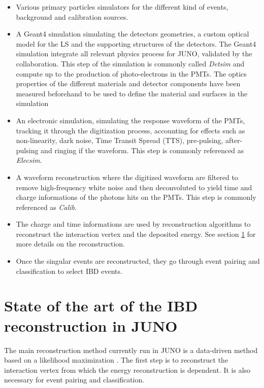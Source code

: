 \begin{itemize}
  \item Various primary particles simulators for the different kind of events, background and calibration sources.
  \item A Geant4 \cite{agostinelli_geant4simulation_2003, allison_geant4_2006, allison_recent_2016} simulation simulating the detectors geometries, a custom optical model for the LS and the supporting structures of the detectors. The Geant4 simulation integrate all relevant physics process for JUNO, validated by the collaboration. This step of the simulation is commonly called \textit{Detsim} and compute up to the production of photo-electrons in the PMTs. The optics properties of the different materials and detector components have been measured beforehand to be used to define the material and surfaces in the simulation
  \item An electronic simulation, simulating the response waveform of the PMTs, tracking it through the digitization process, accounting for effects such as non-linearity, dark noise, Time Transit Spread (TTS), pre-pulsing, after-pulsing and ringing if the waveform. This step is commonly referenced as \textit{Elecsim}.
  \item A waveform reconstruction where the digitized waveform are filtered to remove high-frequency white noise and then deconvoluted to yield time and charge informations of the photons hits on the PMTs. This step is commonly referenced as \textit{Calib}.
  \item The charge and time informations are used by reconstruction algorithms to reconstruct the interaction vertex and the deposited energy. See section \ref{sec:reco} for more details on the reconstruction.
  \item Once the singular events are reconstructed, they go through event pairing and classification to select IBD events.
\end{itemize}

\section{State of the art of the IBD reconstruction in JUNO}
\label{sec:reco}

The main reconstruction method currently run in JUNO is a data-driven method based on a likelihood maximization \cite{wu_new_2019, huang_improving_2021}. The first step is to reconstruct the interaction vertex from which the energy reconstruction is dependent. It is also necessary for event pairing and classification.

